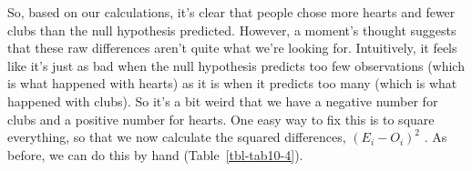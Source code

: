 \documentclass[
  a4paper,
]{book}
\begin{document}
So, based on our calculations, it's clear that people chose more hearts
and fewer clubs than the null hypothesis predicted. However, a moment's
thought suggests that these raw differences aren't quite what we're
looking for. Intuitively, it feels like it's just as bad when the null
hypothesis predicts too few observations (which is what happened with
hearts) as it is when it predicts too many (which is what happened with
clubs). So it's a bit weird that we have a negative number for clubs and
a positive number for hearts. One easy way to fix this is to square
everything, so that we now calculate the squared differences,
\((E_i - O_i)^2\) . As before, we can do this by hand
(Table~\ref{tbl-tab10-4}).

\hypertarget{tbl-tab10-4}{}
 
  \providecommand{\huxb}[2]{\arrayrulecolor[RGB]{#1}\global\arrayrulewidth=#2pt}
  \providecommand{\huxvb}[2]{\color[RGB]{#1}\vrule width #2pt}
  \providecommand{\huxtpad}[1]{\rule{0pt}{#1}}
  \providecommand{\huxbpad}[1]{\rule[-#1]{0pt}{#1}}
\end{document}
